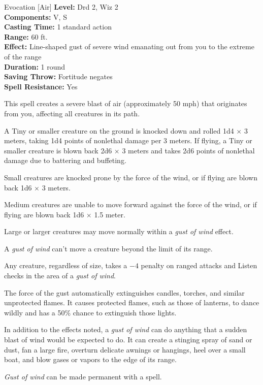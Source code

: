 {Evocation [Air]}
{
	\textbf{Level:}
	Drd 2, Wiz 2\\
	\textbf{Components:}
	V, S\\
	\textbf{Casting Time:}
	1 standard action\\
	\textbf{Range:}
	60 ft.\\
	\textbf{Effect:}
	Line-shaped gust of severe wind emanating out from you to the extreme of the range\\
	\textbf{Duration:}
	1 round\\
	\textbf{Saving Throw:}
	Fortitude negates\\
	\textbf{Spell Resistance:}
	Yes\\
}
{
	This spell creates a severe blast of air (approximately 50 mph) that originates from you, affecting all creatures in its path.

	A Tiny or smaller creature on the ground is knocked down and rolled 1d4 $\times$ 3 meters, taking 1d4 points of nonlethal damage per 3 meters. If flying, a Tiny or smaller creature is blown back 2d6 $\times$ 3 meters and takes 2d6 points of nonlethal damage due to battering and buffeting.

	Small creatures are knocked prone by the force of the wind, or if flying are blown back 1d6 $\times$ 3 meters.

	Medium creatures are unable to move forward against the force of the wind, or if flying are blown back 1d6 $\times$ 1.5 meter.

	Large or larger creatures may move normally within a \emph{gust of wind} effect.

	A \emph{gust of wind} can't move a creature beyond the limit of its range.

	Any creature, regardless of size, takes a $-4$ penalty on ranged attacks and Listen checks in the area of a \emph{gust of wind}.

	The force of the gust automatically extinguishes candles, torches, and similar unprotected flames. It causes protected flames, such as those of lanterns, to dance wildly and has a 50\% chance to extinguish those lights.

	In addition to the effects noted, a \emph{gust of wind} can do anything that a sudden blast of wind would be expected to do. It can create a stinging spray of sand or dust, fan a large fire, overturn delicate awnings or hangings, heel over a small boat, and blow gases or vapors to the edge of its range.

	\emph{Gust of wind} can be made permanent with a  spell.

}
